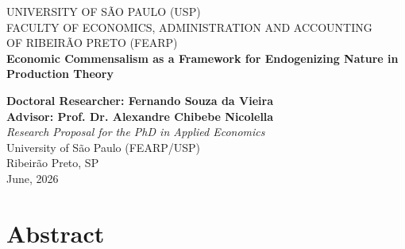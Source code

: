 \documentclass[a4paper,12pt,oneside,brazil,english,nottoc,notbib]{abntex2}
\newcommand{\listabstractname}{Abstract}
\newcommand{\addabstracttoc}{%
  \addcontentsline{toc}{section}{\protect\numberline{}\listabstractname}%
}
\renewcommand{\thesection}{\arabic{section}.}
\begin{document}
\begin{titlingpage}
    \centering
    {\large UNIVERSITY OF S\~AO PAULO (USP)\\[0.2cm]
    FACULTY OF ECONOMICS, ADMINISTRATION AND ACCOUNTING\\
    OF RIBEIR\~AO PRETO (FEARP)}\\[3.5cm]

    {\Huge \bfseries Economic Commensalism as a Framework for Endogenizing Nature in Production Theory}\\[0.5cm]

    \vspace{1.5cm}

    {\large \textbf{Doctoral Researcher: Fernando Souza da Vieira}}\\[0.3cm]
    {\large \textbf{Advisor: Prof. Dr. Alexandre Chibebe Nicolella}}\\[2cm]

    \textit{Research Proposal for the PhD in Applied Economics}\\
    University of S\~ao Paulo (FEARP/USP)\\[2.5cm]

\vfill
{\large Ribeir\~ao Preto, SP}\\[0.3cm]
{\large June, 2026}

\end{titlingpage}

\clearpage
\begingroup
{}
\renewcommand{\addcontentsline}[3]{}
\tableofcontents
\endgroup
\clearpage

\setcounter{page}{5}
\pagestyle{fancy}

\clearpage
\addabstracttoc
\section*{Abstract}


\clearpage
\thispagestyle{fancy}

\clearpage
\thispagestyle{fancy}

\clearpage
\thispagestyle{fancy}

\clearpage
\thispagestyle{fancy}


\clearpage
\appendix
\renewcommand{\thesection}{\Alph{section}.}
\thispagestyle{fancy}

\clearpage
\thispagestyle{fancy}


\clearpage


\end{document}
